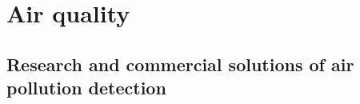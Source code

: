 \section{Air quality}

	
	
	
	
	
	
	
	

	\subsection{Research and commercial solutions of air pollution detection}
	



